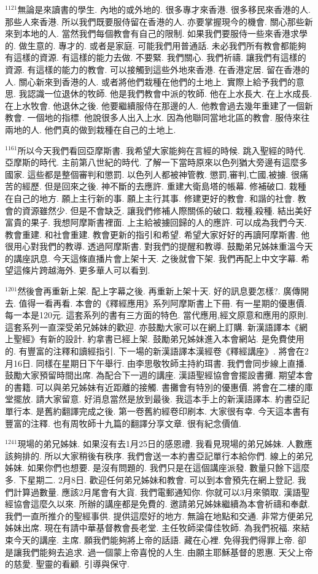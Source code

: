 \documentclass{book}
\begin{document}
$^{1121}$無論是來讀書的學生.
內地的或外地的.
很多專才來香港.
很多移民來香港的人.
那些人來香港.
所以我們既要服侍留在香港的人.
亦要掌握現今的機會.
關心那些新來到本地的人.
當然我們每個教會有自己的限制.
如果我們要服侍一些來香港求學的.
做生意的.
專才的.
或者是家庭.
可能我們用普通話.
未必我們所有教會都能夠有這樣的資源.
有這樣的能力去做.
不要緊.
我們關心.
我們祈禱.
讓我們有這樣的資源.
有這樣的能力的教會.
可以接觸到這些外地來香港.
在香港定居.
留在香港的人.
關心新來到香港的人.
或者將他們栽種在他們的土地上.
實際上給予我們的意思.
我認識一位退休的牧師.
他是我們教會中派的牧師.
他在上水長大.
在上水成長.
在上水牧會.
他退休之後.
他要繼續服侍在那邊的人.
他教會過去幾年重建了一個新教會.
一個地的指標.
他說很多人出入上水.
因為他聯同當地北區的教會.
服侍來往兩地的人.
他們真的做到栽種在自己的土地上.

$^{1161}$所以今天我們看回亞摩斯書.
我希望大家能夠在言經的時候.
跳入聖經的時代.
亞摩斯的時代.
主前第八世紀的時代.
了解一下當時原來以色列猶大旁邊有這麼多國家.
這些都是整個審判和懲罰.
以色列人都被神管教.
懲罰,審判,亡國,被擄.
很痛苦的經歷.
但是回來之後.
神不斷的去應許.
重建大衛島塔的帳幕.
修補破口.
栽種在自己的地方.
願上主行新的事.
願上主行其事.
修建更好的教會.
和諧的社會.
教會的資源雖然少.
但是不會缺乏.
讓我們修補人際關係的破口.
栽種,殺種.
結出美好富貴的果子.
我想阿摩斯書裡面.
上主給被擄回歸的人的應許.
可以成為我們今天.
教會重建.
和社會重建.
教會更新的指引和希望.
希望大家好好的再讀阿摩斯書.
他很用心對我們的教導.
透過阿摩斯書.
對我們的提醒和教導.
鼓勵弟兄姊妹重溫今天的講座訊息.
今天這條直播片會上架十天.
之後就會下架.
我們再配上中文字幕.
希望這條片跨越海外.
更多華人可以看到.

$^{1201}$然後會再重新上架.
配上字幕之後.
再重新上架十天.
好的訊息要怎樣?.
廣傳開去.
值得一看再看.
本會的《釋經應用》系列阿摩斯書上下冊.
有一星期的優惠價.
每一本是120元.
這套系列的書有三方面的特色.
當代應用,經文原意和應用的原則.
這套系列一直深受弟兄姊妹的歡迎.
亦鼓勵大家可以在網上訂購.
新漢語譯本《網上聖經》有新的設計.
約拿書已經上架.
鼓勵弟兄姊妹進入本會網站.
是免費使用的.
有豐富的注釋和讀經指引.
下一場的新漢語譯本漢經卷《釋經講座》.
將會在2月16日.
同樣在星期日下午舉行.
由李思敬牧師主持約珥書.
我們會同步線上直播.
鼓勵大家預留時間出席.
為配合下一週的講座.
漢語聖經協會會擺設書攤.
期望本會的書籍.
可以與弟兄姊妹有近距離的接觸.
書攤會有特別的優惠價.
將會在二樓的庫堂擺放.
請大家留意.
好消息當然是放到最後.
我這本手上的新漢語譯本.
約書亞記單行本.
是舊約翻譯完成之後.
第一卷舊約經卷印刷本.
大家很有幸.
今天這本書有豐富的注釋.
也有周牧師十九篇的翻譯分享文章.
很有紀念價值.

$^{1241}$現場的弟兄姊妹.
如果沒有去1月25日的感恩禮.
我看見現場的弟兄姊妹.
人數應該夠排的.
所以大家稍後有秩序.
我們會送一本約書亞記單行本給你們.
線上的弟兄姊妹.
如果你們也想要.
是沒有問題的.
我們只是在這個講座派發.
數量只餘下這麼多.
下星期二.
2月8日.
歡迎任何弟兄姊妹和教會.
可以到本會預先在網上登記.
我們計算過數量.
應該2月尾會有大貨.
我們電郵通知你.
你就可以3月來領取.
漢語聖經協會這麼久以來.
所辦的講座都是免費的.
邀請弟兄姊妹繼續為本會祈禱和奉獻.
我們一直所推介的聖經事供.
提供這麼好的地方.
無論在地點和交通.
非常方便弟兄姊妹出席.
現在有請中華基督教會長老堂.
主任牧師梁偉佳牧師.
為我們祝福.
來結束今天的講座.
主席.
願我們能夠將上帝的話語.
藏在心裡.
免得我們得罪上帝.
卻是讓我們能夠去追求.
過一個蒙上帝喜悅的人生.
由願主耶穌基督的恩惠.
天父上帝的慈愛.
聖靈的看顧.
引導與保守.
\end{document}

